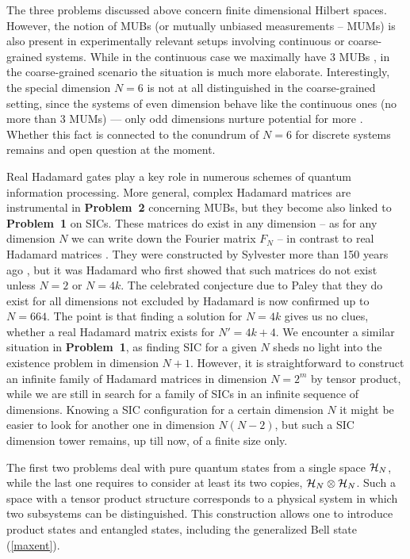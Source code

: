 \documentclass[english,aps,pra,nofootinbib,twocolumn,superscriptaddress]{revtex4-1}
\newcommand{\1}{{\rm 1\hspace{-0.9mm}l}}
\begin{document}
The three problems discussed above concern finite dimensional
Hilbert spaces. However, the notion of MUBs (or mutually unbiased measurements -- MUMs) is also present in experimentally relevant setups involving continuous \cite{WeigertCV} or coarse-grained \cite{MUMPRL} systems. While in the continuous case we maximally have $3$ MUBs \cite{WeigertCV}, in the coarse-grained scenario \cite{ManyMUMs} the situation is much more elaborate. Interestingly, the special dimension $N=6$ is not at all distinguished in the coarse-grained setting, since the systems of even dimension behave like the continuous ones (no more than 3 MUMs) --- only odd dimensions nurture potential for more \cite{ManyMUMs}. Whether this fact is connected to the conundrum of $N=6$ for discrete systems remains and open question at the moment.

Real Hadamard gates play a key role in numerous schemes of
 quantum information processing. More general, complex Hadamard matrices are instrumental in  {\bf Problem~2} concerning MUBs,
  but they become also linked  \cite{ABFG19}
  to {\bf Problem~1} on SICs. 
  These matrices do exist in any dimension -- as for any dimension $N$ we can write down 
  the Fourier matrix $F_N$ -- 
in contrast to real Hadamard matrices  \cite{DEBZ10}. 
They were constructed  by Sylvester  more than 150 years ago \cite{Syl67}, 
 but it was Hadamard who first showed \cite{Ha93} 
 that such matrices do not exist unless $N=2$ or $N=4k$.
  The celebrated conjecture due to Paley \cite{Pa33} 
 that they do exist for all dimensions not excluded by Hadamard is now
  confirmed \cite{KTR05} up to $N=664$. The point is that finding a solution for $N=4k$ gives us no clues,  whether a real Hadamard matrix exists for $N'=4k+4$. We encounter a
   similar situation 
 in {\bf Problem~1}, as finding SIC for a given $N$ sheds no light into the existence problem in dimension $N+1$. However, it is straightforward to
 construct  an infinite family  of Hadamard matrices in dimension 
 $N=2^m$ by tensor product, 
  while we are still in search for  a family of SICs in an infinite sequence of dimensions.
 Knowing a SIC configuration 
 for a certain dimension $N$ it might be easier to look for another one
 in dimension $N(N-2)$, but such a SIC dimension tower \cite{ABDF17,AD19}
 remains, up till now,  of a finite size only.

The first two problems deal with pure quantum states from a single space ${\cal H}_N$,
while  the last one requires to consider at least its two copies,
 ${\cal H}_N \otimes {\cal H}_N$.
Such a space with a tensor product structure
corresponds to a physical system in which two subsystems can be distinguished.
This construction allows one to introduce product states
and entangled states,  including the generalized Bell state (\ref{maxent}).
\end{document}
